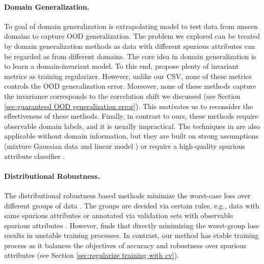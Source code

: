 \documentclass{article} %
\begin{document}
	\paragraph{Domain Generalization.} To goal of domain generalization is extrapolating model to test data from unseen domains to capture OOD generalization. The problem we explored can be treated by domain generalization methods as data with different spurious attributes can be regarded as from different domains. The core idea in domain generalization is to learn a domain-invariant model. To this end, \cite{arjovsky2019invariant,hu2020domain,li2018deep,mahajan2021domain,heinze2021conditional,krueger2021out,wald2021calibration,seo2022information} propose plenty of invariant metrics as training regularizer. However, unlike our CSV, none of these metrics controls the OOD generalization error. Moreover, none of these methods capture the invariance corresponds to the correlation shift we discussed (see Section \ref{sec:guaranteed OOD generalization error}). This motivates us to reconsider the effectiveness of these methods. Finally, in contrast to ours, these methods require observable domain labels, and it is usually impractical. The techniques in \citep{liu2021heterogeneous,arpit2019predicting,sohoni2020no,creager2021environment} are also applicable without domain information, but they are built on strong assumptions (mixture Gaussian data \citep{liu2021heterogeneous} and linear model \citep{arpit2019predicting}) or require a high-quality spurious attribute classifier \citep{sohoni2020no,creager2021environment}.
	
	\paragraph{Distributional Robustness.} The distributional robustness \citep{ben2013robust} based methods minimize the worst-case loss over different groups of data \citep{sagawa2019distributionally,liu2021just,zhou2022model}. The groups are decided via certain rules, e.g., data with same spurious attributes \citep{sagawa2019distributionally} or annotated via validation sets with observable spurious attributes \citep{liu2021just,zhou2022model}. However, \cite{sagawa2019distributionally} finds that directly minimizing the worst-group loss results in unstable training processes. In contrast, our method has stable training process as it balances the objectives of accuracy and robustness over spurious attributes (see Section \ref{sec:regularize training with cv}).
	
\end{document}
